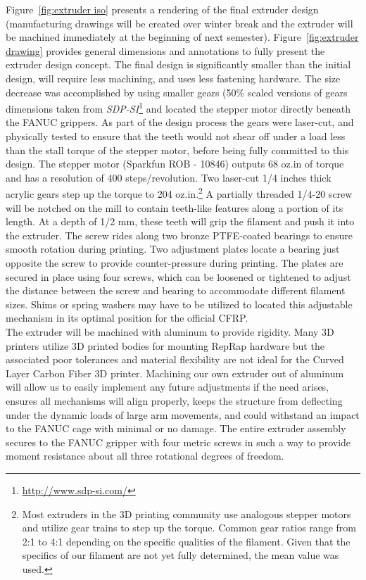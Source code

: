 Figure~\ref{fig:extruder iso} presents a rendering of the final extruder design (manufacturing drawings will be created over winter break and the extruder will be machined immediately at the beginning of next semester). Figure~\ref{fig:extruder drawing} provides general dimensions and annotations to fully present the extruder design concept. The final design is significantly smaller than the initial design, will require less machining, and uses less fastening hardware. The size decrease was accomplished by using smaller gears (50\% scaled versions of gears dimensions taken from \emph{SDP-SI}\footnote{\url{http://www.sdp-si.com/}} and located the stepper motor directly beneath the FANUC grippers. As part of the design process the gears were laser-cut, and physically tested to ensure that the teeth would not shear off under a load less than the stall torque of the stepper motor, before being fully committed to this design. The stepper motor (Sparkfun ROB - 10846) outputs 68 oz.in of torque and has a resolution of 400 steps/revolution. Two laser-cut 1/4 inches thick acrylic gears step up the torque to 204 oz.in.\footnote{Most extruders in the 3D printing community use analogous stepper motors and utilize gear trains to step up the torque. Common gear ratios range from 2:1 to 4:1 depending on the specific qualities of the filament. Given that the specifics of our filament are not yet fully determined, the mean value was used.} A partially threaded 1/4-20 screw will be notched on the mill to contain teeth-like features along a portion of its length. At a depth of 1/2 mm, these teeth will grip the filament and push it into the extruder. The screw rides along two bronze PTFE-coated bearings to ensure smooth rotation during printing. Two adjustment plates locate a bearing just opposite the screw to provide counter-pressure during printing. The plates are secured in place using four screws, which can be loosened or tightened to adjust the distance between the screw and bearing to accommodate different filament sizes. Shims or spring washers may have to be utilized to located this adjustable mechanism in its optimal position for the official CFRP.\\

The extruder will be machined with aluminum to provide rigidity. Many 3D printers utilize 3D printed bodies for mounting RepRap hardware but the associated poor tolerances and material flexibility are not ideal for the Curved Layer Carbon Fiber 3D printer. Machining our own extruder out of aluminum will allow us to easily implement any future adjustments if the need arises, ensures all mechanisms will align properly, keeps the structure from deflecting under the dynamic loads of large arm movements, and could withstand an impact to the FANUC cage with minimal or no damage. The entire extruder assembly secures to the FANUC gripper with four metric screws in such a way to provide moment resistance about all three rotational degrees of freedom.\\

